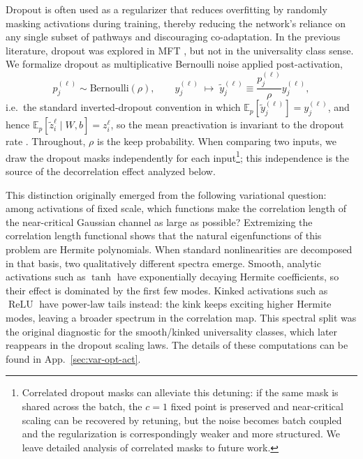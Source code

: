 \documentclass{article}
\DeclareMathOperator{\ReLU}{ReLU}
\newcommand{\relu}{\ensuremath{\ReLU}}
\theoremstyle{plain}
\theoremstyle{definition}
\theoremstyle{remark}
\begin{document}
Dropout \cite{srivastava2014dropout,wager2013dropout} is often used as a regularizer that reduces overfitting by randomly masking activations during training, thereby reducing the network’s reliance on any single subset of pathways and discouraging co-adaptation. In the previous literature, dropout was explored in MFT \cite{lee2019mean, schoenholz2017deepinformationpropagation}, but not in the universality class sense. We formalize dropout as multiplicative Bernoulli noise applied post-activation,
\relax
\begin{equation}
p^{(\ell)}_{j} \sim \mathrm{Bernoulli}(\rho), \qquad y^{(\ell)}_j \;\mapsto\; \tilde y^{(\ell)}_j \equiv \frac{p^{(\ell)}_{j}}{\rho} y^{(\ell)}_j,
\end{equation}
\relax
i.e.\ the standard inverted-dropout convention in which $\mathbb E_p[\tilde y^{(\ell)}_j]=y^{(\ell)}_j$, and hence $\mathbb E_p[\tilde z^\ell_i\mid W,b]=z^\ell_i$, so the mean preactivation is invariant to the dropout rate \cite{schoenholz2017deepinformationpropagation}. Throughout, $\rho$ is the keep probability. When comparing two inputs, we draw the dropout masks independently for each input\footnote{Correlated dropout masks can alleviate this detuning: if the same mask is shared across the batch, the \(c=1\) fixed point is preserved and near-critical scaling can be recovered by retuning, but the noise becomes batch coupled and the regularization is correspondingly weaker and more structured. We leave detailed analysis of correlated masks to future work.}; this independence is the source of the decorrelation effect analyzed below.

This distinction originally emerged from the following variational question: among activations of fixed scale, which functions make the correlation length of the near-critical Gaussian channel as large as possible? Extremizing the correlation length functional shows that the natural eigenfunctions of this problem are Hermite polynomials. When standard nonlinearities are decomposed in that basis, two qualitatively different spectra emerge. Smooth, analytic activations such as $\tanh$ have exponentially decaying Hermite coefficients, so their effect is dominated by the first few modes. Kinked activations such as \relu{} have power-law tails instead: the kink keeps exciting higher Hermite modes, leaving a broader spectrum in the correlation map. This spectral split was the original diagnostic for the smooth/kinked universality classes, which later reappears in the dropout scaling laws. The details of these computations can be found in App.~\ref{sec:var-opt-act}.
\end{document}
